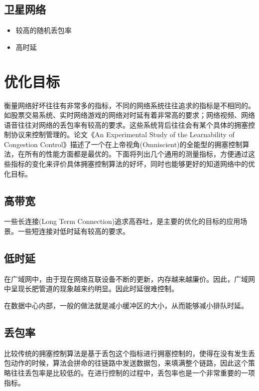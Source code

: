\documentclass[a4paper, 12pt, UTF8]{ctexart}
\begin{document}
\subsection{卫星网络}
\begin{itemize}
	\item 较高的随机丢包率
	\item 高时延
\end{itemize}

\clearpage

\section{优化目标}
\par 衡量网络好坏往往有非常多的指标，不同的网络系统往往追求的指标是不相同的。如股票交易系统、实时网络游戏的网络对时延有着非常高的要求；网络视频、网络语音往往对网络的丢包率有较高的要求。这些系统背后往往会有某个具体的拥塞控制协议来控制管理的。论文《An Experimental Study of the Learnability of Congestion Control》\cite{DBLP:conf/sigcomm/SivaramanWTB14}描述了一个在上帝视角(Omniscient)的全能型的拥塞控制算法，在所有的性能方面都是最优的。下面将列出几个通用的测量指标，方便通过这些指标的变化来评价具体拥塞控制算法的好坏，同时也能够更好的知道网络中的优化目标。


\subsection{高带宽}
\par 一些长连接(Long Term Connection)追求高吞吐，是主要的优化的目标的应用场景。一些短连接对低时延有较高的要求。
\subsection{低时延}
\par 在广域网中，由于现在网络互联设备不断的更新，内存越来越廉价。因此，广域网中呈现长肥管道的现象越来约明显。因此时延很难控制。

\par 在数据中心内部，一般的做法就是减小缓冲区的大小，从而能够减小排队时延。

\subsection{丢包率}
\par 比较传统的拥塞控制算法是基于丢包这个指标进行拥塞控制的，使得在没有发生丢包动作的时候，算法会拼命的往链路中发送数据包，来填满整个链路，因此这个策略往往丢包率是比较低的。在进行控制的过程中，丢包率也是一个非常重要的一项指标。
\end{document}
